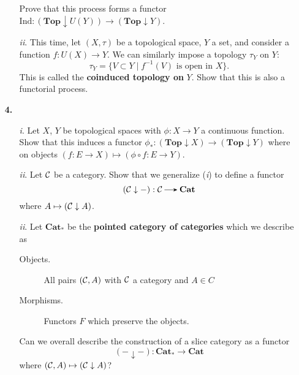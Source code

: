 \begin{itemize}
\begin{itemize}
                Prove that this process forms a functor $\text{Ind}: (\textbf{Top}\downarrow U(Y)) \to (\textbf{Top}\downarrow Y)$. 

                \item[\emph{ii}.] 
                This time, let $(X, \tau)$ be a topological space, $Y$ a set, 
                and consider a function $f: U(X) \to Y$. We can similarly impose a 
                topology $\tau_Y$ on $Y$:
                \[
                    \tau_Y= \{ V \subset Y \mid f^{-1}(V) \text{ is open in }X \}.
                \]
                This is called  the \textbf{coinduced topology on} $Y$. 
                Show that this is also a functorial process. 

            \end{itemize}


            \item[\textbf{4.}]
            \begin{itemize}
                \item[\emph{i}.]
                Let $X$, $Y$ be topological spaces with $\phi: X \to Y$ a continuous function.
                Show that this induces a functor $\phi_*: (\textbf{Top}\downarrow X) \to (\textbf{Top}\downarrow Y)$ 
                where on objects $(f: E \to X) \mapsto (\phi \circ f: E \to Y)$. 

                \item[\emph{ii}.]
                Let $\mathcal{C}$ be a category. Show that we generalize (\emph{i}) to define a functor 
                \[
                    (\cc \downarrow -): \cc \to \textbf{Cat}
                \]
                where $A \mapsto (\mathcal{C} \downarrow A)$.


                \item[\emph{ii}.]
                Let $\textbf{Cat}_*$ be the \textbf{pointed category of categories} 
                which we describe as 
                \begin{description}
                    \item[Objects.] All pairs $(\mathcal{C}, A)$ with $\mathcal{C}$ a category and $A \in C$
                    \item[Morphisms.] Functors $F$ which preserve the objects.  
                \end{description}
                Can we overall describe the construction of a slice category as a functor
                \[
                    (-  \downarrow -): \textbf{Cat}_* \to \textbf{Cat}    
                \]
                where $(\mathcal{C},  A) \mapsto  (\mathcal{C} \downarrow A)$? 
            \end{itemize}
            

\end{itemize}
